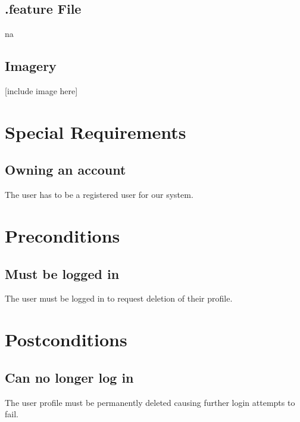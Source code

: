 \documentclass[a4paper,12pt,chapterprefix=false,bibliography=totoc,listof=totoc,book]{scrreprt}
\begin{document}
    \section{.feature File}
    \gls{na}

    \section{Imagery}
    [include image here]

    \chapter{Special Requirements}
    \section{Owning an account}
    The user has to be a registered user for our system.

    \chapter{Preconditions}
    \section{Must be logged in}
    The user must be logged in to request deletion of their profile.

    \chapter{Postconditions}
    \section{Can no longer log in}
    The user profile must be permanently deleted causing further login attempts to fail.
\end{document}
